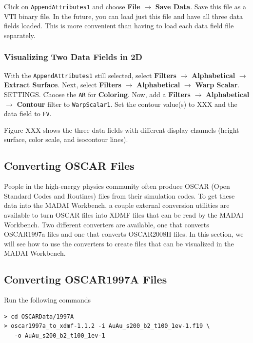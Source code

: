 \documentclass[12pt]{article}
\newcommand{\filter}[1]{\textbf{#1}}
\newcommand{\filterinstance}[1]{\texttt{#1}}
\newcommand{\menu}[1]{\textbf{#1}}
\newcommand{\setting}[1]{\textbf{#1}}
\newcommand{\field}[1]{\texttt{#1}}
\begin{document}
Click on \filterinstance{AppendAttributes1} and choose \menu{File} $\rightarrow$ \menu{Save Data}. Save this file as a VTI binary file. In the future, you can load just this file and have all three data fields loaded. This is more convenient than having to load each data field file separately.

\subsubsection{Visualizing Two Data Fields in 2D}

With the \filterinstance{AppendAttributes1} still selected, select \filter{Filters} $\rightarrow$ \filter{Alphabetical} $\rightarrow$ \filter{Extract Surface}. Next, select \filter{Filters} $\rightarrow$ \filter{Alphabetical} $\rightarrow$ \filter{Warp Scalar}. SETTINGS. Choose the \field{AR} for \setting{Coloring}. Now, add a \menu{Filters} $\rightarrow$ \menu{Alphabetical} $\rightarrow$ \menu{Contour} filter to \filterinstance{WarpScalar1}. Set the contour value(s) to XXX and the data field to \field{FV}.

Figure XXX shows the three data fields with different display channels (height surface, color scale, and isocontour lines).

\subsection{Converting OSCAR Files}

People in the high-energy physics community often produce OSCAR (Open Standard Codes and Routines) files from their simulation codes. To get these data into the MADAI Workbench, a couple external conversion utilities are available to turn OSCAR files into XDMF files that can be read by the MADAI Workbench. Two different converters are available, one that converts OSCAR1997a files and one that converts OSCAR2008H files. In this section, we will see how to use the converters to create files that can be visualized in the MADAI Workbench.

\subsection{Converting OSCAR1997A Files}

Run the following commands

\begin{verbatim}
> cd OSCARData/1997A
> oscar1997a_to_xdmf-1.1.2 -i AuAu_s200_b2_t100_1ev-1.f19 \
   -o AuAu_s200_b2_t100_1ev-1
\end{verbatim}
\end{document}
